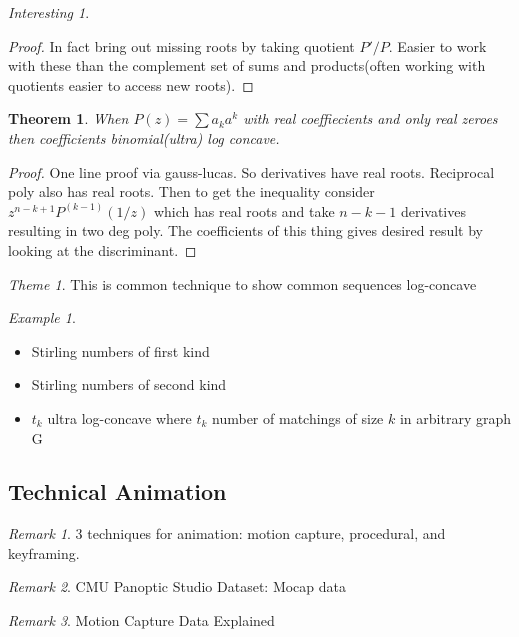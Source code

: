 \documentclass[11pt]{article}
\newtheorem{theorem}{Theorem}
\theoremstyle{remark}
\newtheorem{remark}{Remark}
\newtheorem{interest}{Interesting}
\newtheorem{theme}{Theme}
\newtheorem{example}{Example}
\begin{document}
\begin{interest}
\begin{proof}
	In fact bring out missing roots by taking quotient $P'/P$. Easier to work with these than the complement set of sums and products(often working with quotients easier to access new roots).
\end{proof}

\begin{theorem}
	When $P(z) = \sum a_k a^k$ with real coeffiecients and only real zeroes then coefficients binomial(ultra) log concave.
\end{theorem}

\begin{proof}
	One line proof via gauss-lucas. So derivatives have real roots. Reciprocal poly also has real roots. Then to get the inequality consider $z^{n-k+1}P^{(k-1)}(1/z)$ which has real roots and take $n-k-1$ derivatives resulting in two deg poly. The coefficients of this thing gives desired result by looking at the discriminant.
\end{proof}

\begin{theme}
	This is common technique to show common sequences log-concave
\end{theme}

\begin{example}
	\begin{itemize}
		\item Stirling numbers of first kind
		\item Stirling numbers of second kind
		\item $t_k$ ultra log-concave where $t_k$ number of matchings of size $k$ in arbitrary graph G
	\end{itemize}
\end{example}

\subsection{Technical Animation}

\begin{remark}
	3 techniques for animation: motion capture, procedural, and keyframing.
\end{remark}

\begin{remark}
	CMU Panoptic Studio Dataset: Mocap data
\end{remark}

\begin{remark}
	Motion Capture Data Explained
\end{remark}


\end{interest}
\end{document}
